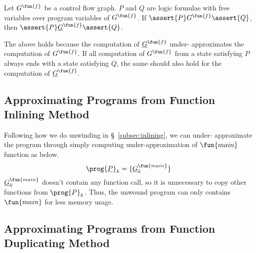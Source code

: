 \begin{proposition}
  Let $G^\fun{f}$ be a control flow graph. $P$ and $Q$ are logic formulae with
  free variables over program variables of $G^\fun{f}$. If $\assert{P}
  G^\fun{f} \assert{Q}$, then 
  $\assert{P} \underline{G}^\fun{f} \assert{Q}$.
\end{proposition}
The above holds because the computation of $\underline{G}^\fun{f}$ under-
approximates the computation of $G^\fun{f}$.
If all computation of $G^\fun{f}$ from a state satisfying $P$ always ends with
a state satisfying $Q$,
the same should also hold for the computation of $\underline{G}^\fun{f}$.


\subsection{Approximating Programs from Function Inlining Method}
Following how we do unwinding in \S~\ref{subsec:inlining}, we can under-
approximate the program through simply computing under-approximation of
$\fun{main}$ function as below.
\[
\prog{\underline{P}}_k = \{\underline{G}^\fun{main}_k\}
\]
$\underline{G}^\fun{main}_k$ doesn't contain any function call,
so it is unnecessary to copy other functions from $\prog{P}_k$.
Thus, the unwound program can only contains $\fun{main}$ for less memory usage.


\subsection{Approximating Programs from Function Duplicating Method}

